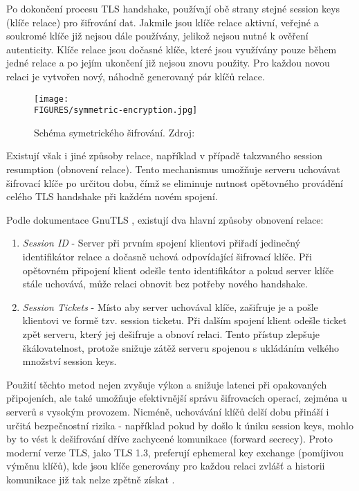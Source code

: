 Po dokončení procesu TLS handshake, používají obě strany stejné session keys (klíče relace) pro šifrování dat. Jakmile jsou klíče relace aktivní, veřejné a soukromé klíče již nejsou dále používány, jelikož nejsou nutné k ověření autenticity. Klíče relace jsou dočasné klíče, které jsou využívány pouze během jedné relace a po jejím ukončení již nejsou znovu použity. Pro každou novou relaci je vytvořen nový, náhodně generovaný pár klíčů relace.

\begin{figure}[htbp]
    \centering
    \texttt{[image: \\FIGURES/symmetric-encryption.jpg]}
    \caption{Schéma symetrického šifrování. Zdroj: \parencite{cloudflare2024}}
    \label{fig:symmetric-encryption}
\end{figure}

Existují však i jiné způsoby relace, například v případě takzvaného session resumption (obnovení relace). Tento mechanismus umožňuje serveru uchovávat šifrovací klíče po určitou dobu, čímž se eliminuje nutnost opětovného provádění celého TLS handshake při každém novém spojení.

Podle dokumentace GnuTLS \textcite{gnutls2024}, existují dva hlavní způsoby obnovení relace:
\begin {enumerate}
\item \textit{Session ID} - Server při prvním spojení klientovi přiřadí jedinečný identifikátor relace a dočasně uchová odpovídající šifrovací klíče. Při opětovném připojení klient odešle tento identifikátor a pokud server klíče stále uchovává, může relaci obnovit bez potřeby nového handshake.
\item \textit{Session Tickets} - Místo aby server uchovával klíče, zašifruje je a pošle klientovi ve formě tzv. session ticketu. Při dalším spojení klient odešle ticket zpět serveru, který jej dešifruje a obnoví relaci. Tento přístup zlepšuje škálovatelnost, protože snižuje zátěž serveru spojenou s ukládáním velkého množství session keys.
\end {enumerate}

Použití těchto metod nejen zvyšuje výkon a snižuje latenci při opakovaných připojeních, ale také umožňuje efektivnější správu šifrovacích operací, zejména u serverů s vysokým provozem. Nicméně, uchovávání klíčů delší dobu přináší i určitá bezpečnostní rizika - například pokud by došlo k úniku session keys, mohlo by to vést k dešifrování dříve zachycené komunikace (forward secrecy).
Proto moderní verze TLS, jako TLS 1.3, preferují ephemeral key exchange (pomíjivou výměnu klíčů), kde jsou klíče generovány pro každou relaci zvlášť a historii komunikace již tak nelze zpětně získat \parencite {gnutls2024}. 

